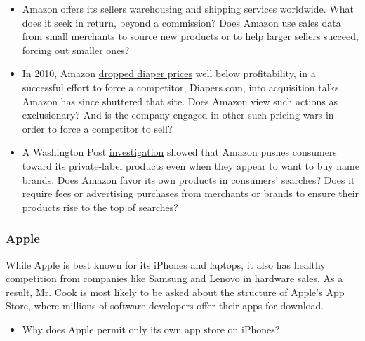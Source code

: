 \begin{itemize}
\tightlist
\item
  Amazon offers its sellers warehousing and shipping services worldwide.
  What does it seek in return, beyond a commission? Does Amazon use
  sales data from small merchants to source new products or to help
  larger sellers succeed, forcing out
  \href{https://www.usatoday.com/story/tech/news/2019/07/16/amazon-faces-antitrust-probe-business-practices-european-union/1742868001/}{smaller
  ones}?
\end{itemize}

\begin{itemize}
\tightlist
\item
  In 2010, Amazon
  \href{http://www.slate.com/blogs/future_tense/2013/10/10/amazon_book_how_jeff_bezos_went_thermonuclear_on_diapers_com.html/}{dropped
  diaper prices} well below profitability, in a successful effort to
  force a competitor, Diapers.com, into acquisition talks. Amazon has
  since shuttered that site. Does Amazon view such actions as
  exclusionary? And is the company engaged in other such pricing wars in
  order to force a competitor to sell?
\end{itemize}

\begin{itemize}
\tightlist
\item
  A Washington Post
  \href{https://www.washingtonpost.com/technology/2019/08/27/aggressive-amazon-tactic-pushes-you-consider-its-own-brand-before-you-click-buy/}{investigation}
  showed that Amazon pushes consumers toward its private-label products
  even when they appear to want to buy name brands. Does Amazon favor
  its own products in consumers' searches? Does it require fees or
  advertising purchases from merchants or brands to ensure their
  products rise to the top of searches?
\end{itemize}

\hypertarget{apple}{%
\subsubsection{Apple}\label{apple}}

While Apple is best known for its iPhones and laptops, it also has
healthy competition from companies like Samsung and Lenovo in hardware
sales. As a result, Mr. Cook is most likely to be asked about the
structure of Apple's App Store, where millions of software developers
offer their apps for download.

\begin{itemize}
\tightlist
\item
  Why does Apple permit only its own app store on iPhones?
\end{itemize}

